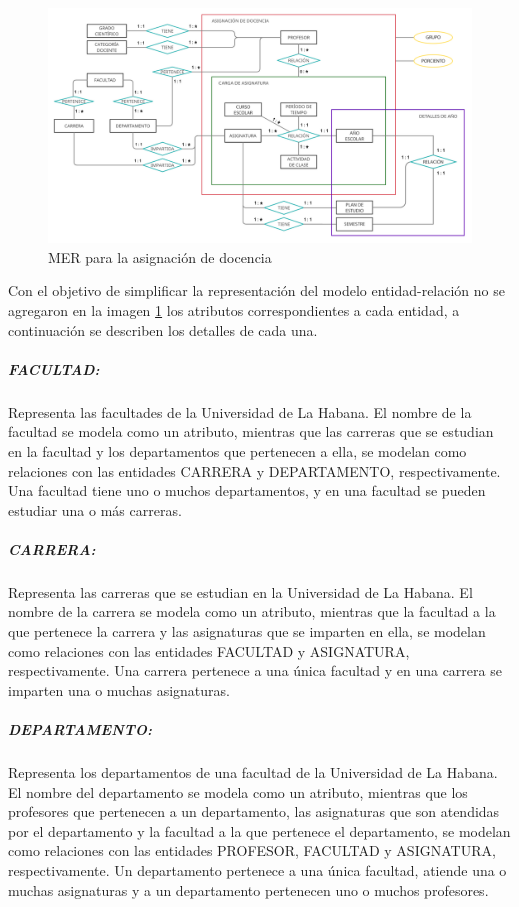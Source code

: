\begin{figure}[H]
    \includegraphics[scale=0.25]{Graphics/Database/MERXX-TA-FINAL.png}
    \caption{MER para la asignación de docencia}
    \label{merxx-docencia}
    
\end{figure}


Con el objetivo de simplificar la representación del modelo entidad-relación
no se agregaron en la imagen \ref{merxx-docencia} los atributos correspondientes a cada entidad,
a continuación se describen los detalles de cada una.


\subparagraph{FACULTAD:}
Representa las facultades de la Universidad de La Habana.
El nombre de la facultad se modela como un atributo, mientras que 
las carreras que se estudian en la facultad y los departamentos que pertenecen 
a ella, se modelan como relaciones con las entidades CARRERA y DEPARTAMENTO, respectivamente.
Una facultad tiene uno o muchos departamentos, y en 
una facultad se pueden estudiar una o más carreras.

\subparagraph{CARRERA:}
Representa las carreras que se estudian en la Universidad de La Habana.
El nombre de la carrera se modela como un atributo, mientras que la facultad a la que pertenece la carrera y
las asignaturas que se imparten en ella, se modelan como relaciones con las entidades FACULTAD y
ASIGNATURA, respectivamente. 
Una carrera pertenece a una única facultad y en una carrera se imparten una o muchas asignaturas.

\subparagraph{DEPARTAMENTO:}
Representa los departamentos de una facultad de la Universidad de La Habana.
El nombre del departamento se modela como un atributo, mientras que los profesores que 
pertenecen a un departamento, las asignaturas que son atendidas por el departamento y la 
facultad a la que pertenece el departamento, se modelan como relaciones con las entidades 
PROFESOR, FACULTAD y ASIGNATURA, respectivamente. Un departamento pertenece a una única facultad,
atiende una o muchas asignaturas y a un departamento pertenecen uno o muchos 
profesores.

